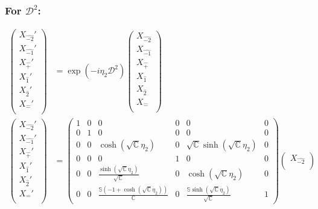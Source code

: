 \documentclass[]{article}
\numberwithin{equation}{section}
\begin{document}
{{\subsubsection{For $\mathcal{D}^{2}$:}
\begin{align}
\begin{pmatrix}
    {X}_{\hat{-2}}'\\
    {X}_{\hat{-1}}'\\
    {X}_{\hat{+}}'\\
    {X}_{\hat{1}}'\\
    {X}_{\hat{2}}'\\
    {X}_{\hat{-}}'\\
    \end{pmatrix}&= \exp{(-i\eta_{2} \mathcal{D}^{2})}\begin{pmatrix}
    {X}_{\hat{-2}}\\
    {X}_{\hat{-1}}\\
    {X}_{\hat{+}}\\
    {X}_{\hat{1}}\\
    {X}_{\hat{2}}\\
    {X}_{\hat{-}}\\
    \end{pmatrix}\\
    \begin{pmatrix}
    {X}_{\hat{-2}}'\\
    {X}_{\hat{-1}}'\\
    {X}_{\hat{+}}'\\
    {X}_{\hat{1}}'\\
    {X}_{\hat{2}}'\\
    {X}_{\hat{-}}'\\
    \end{pmatrix}&= \begin{pmatrix}
        1&0&0&0&0&0\\
        0&1&0&0&0&0\\
        0&0&\cosh{(\sqrt{\mathbb{C}}\eta_{2})}&0&\sqrt{\mathbb{C}}\sinh{(\sqrt{\mathbb{C}}\eta_{2})}&0\\
        0&0&0&1&0&0\\
        0&0&\frac{\sinh{(\sqrt{\mathbb{C}}\eta_{2})}}{\sqrt{\mathbb{C}}}&0&\cosh{(\sqrt{\mathbb{C}}\eta_{2})}&0\\
        0&0&\frac{\mathbb{S}(-1+\cosh{(\sqrt{\mathbb{C}}\eta_{2})})}{\mathbb{C}}&0&\frac{\mathbb{S}\sinh{(\sqrt{\mathbb{C}}\eta_{2})}}{\sqrt{\mathbb{C}}}&1
    \end{pmatrix}\begin{pmatrix}
    {X}_{\hat{-2}}\\

\end{pmatrix}
\end{align}}}
\end{document}
